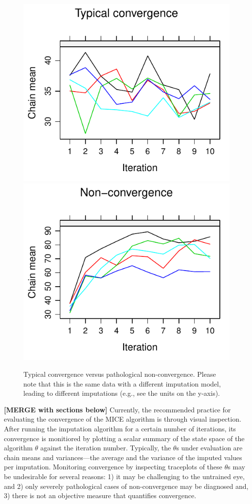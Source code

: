 \documentclass[Royal,times,sageh]{sagej}
\begin{document}
\begin{figure}

{\centering \includegraphics[width=.49\linewidth]{2.Manuscript_files/figure-latex/non-conv-1} \includegraphics[width=.49\linewidth]{2.Manuscript_files/figure-latex/non-conv-2} 

}

\caption{Typical convergence versus pathological non-convergence. Please note that this is the same data with a different imputation model, leading to different imputations (e.g., see the units on the y-axis).}\label{fig:non-conv}
\end{figure}

\textbf{{[}MERGE with sections below{]}} Currently, the recommended practice for evaluating the convergence of the MICE algorithm is through visual inspection. After running the imputation algorithm for a certain number of iterations, its convergence is monitiored by plotting a scalar summary of the state space of the algorithm \(\theta\) against the iteration number. Typically, the \(\theta\)s under evaluation are chain means and variances---the average and the variance of the imputed values per imputation. Monitoring convergence by inspecting traceplots of these \(\theta\)s may be undesirable for several reasons: 1) it may be challenging to the untrained eye, and 2) only severely pathological cases of non-convergence may be diagnosed \citep[\(\S\) 6.5.2]{buur18} and, 3) there is not an objective measure that quantifies convergence.
\end{document}
